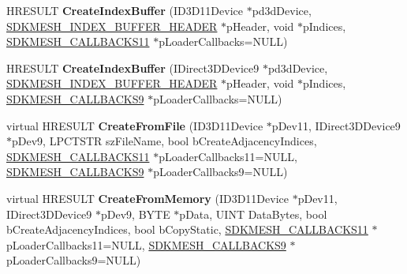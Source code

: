 \begin{DoxyCompactItemize}
\item 
\hypertarget{class_c_d_x_u_t_s_d_k_mesh_abbf305d6839d4ad44b981e291a337a80}{H\+R\+E\+S\+U\+L\+T {\bfseries Create\+Index\+Buffer} (I\+D3\+D11\+Device $\ast$pd3d\+Device, \hyperlink{struct_s_d_k_m_e_s_h___i_n_d_e_x___b_u_f_f_e_r___h_e_a_d_e_r}{S\+D\+K\+M\+E\+S\+H\+\_\+\+I\+N\+D\+E\+X\+\_\+\+B\+U\+F\+F\+E\+R\+\_\+\+H\+E\+A\+D\+E\+R} $\ast$p\+Header, void $\ast$p\+Indices, \hyperlink{struct_s_d_k_m_e_s_h___c_a_l_l_b_a_c_k_s11}{S\+D\+K\+M\+E\+S\+H\+\_\+\+C\+A\+L\+L\+B\+A\+C\+K\+S11} $\ast$p\+Loader\+Callbacks=N\+U\+L\+L)}\label{class_c_d_x_u_t_s_d_k_mesh_abbf305d6839d4ad44b981e291a337a80}

\item 
\hypertarget{class_c_d_x_u_t_s_d_k_mesh_a4cf855d3faa75099a5f4a7bd0b9b6609}{H\+R\+E\+S\+U\+L\+T {\bfseries Create\+Index\+Buffer} (I\+Direct3\+D\+Device9 $\ast$pd3d\+Device, \hyperlink{struct_s_d_k_m_e_s_h___i_n_d_e_x___b_u_f_f_e_r___h_e_a_d_e_r}{S\+D\+K\+M\+E\+S\+H\+\_\+\+I\+N\+D\+E\+X\+\_\+\+B\+U\+F\+F\+E\+R\+\_\+\+H\+E\+A\+D\+E\+R} $\ast$p\+Header, void $\ast$p\+Indices, \hyperlink{struct_s_d_k_m_e_s_h___c_a_l_l_b_a_c_k_s9}{S\+D\+K\+M\+E\+S\+H\+\_\+\+C\+A\+L\+L\+B\+A\+C\+K\+S9} $\ast$p\+Loader\+Callbacks=N\+U\+L\+L)}\label{class_c_d_x_u_t_s_d_k_mesh_a4cf855d3faa75099a5f4a7bd0b9b6609}

\item 
\hypertarget{class_c_d_x_u_t_s_d_k_mesh_a7dfa840bc833d2b9ff22f5b469d9bba6}{virtual H\+R\+E\+S\+U\+L\+T {\bfseries Create\+From\+File} (I\+D3\+D11\+Device $\ast$p\+Dev11, I\+Direct3\+D\+Device9 $\ast$p\+Dev9, L\+P\+C\+T\+S\+T\+R sz\+File\+Name, bool b\+Create\+Adjacency\+Indices, \hyperlink{struct_s_d_k_m_e_s_h___c_a_l_l_b_a_c_k_s11}{S\+D\+K\+M\+E\+S\+H\+\_\+\+C\+A\+L\+L\+B\+A\+C\+K\+S11} $\ast$p\+Loader\+Callbacks11=N\+U\+L\+L, \hyperlink{struct_s_d_k_m_e_s_h___c_a_l_l_b_a_c_k_s9}{S\+D\+K\+M\+E\+S\+H\+\_\+\+C\+A\+L\+L\+B\+A\+C\+K\+S9} $\ast$p\+Loader\+Callbacks9=N\+U\+L\+L)}\label{class_c_d_x_u_t_s_d_k_mesh_a7dfa840bc833d2b9ff22f5b469d9bba6}

\item 
\hypertarget{class_c_d_x_u_t_s_d_k_mesh_a4e87c52d478b54874a18036375291fa9}{virtual H\+R\+E\+S\+U\+L\+T {\bfseries Create\+From\+Memory} (I\+D3\+D11\+Device $\ast$p\+Dev11, I\+Direct3\+D\+Device9 $\ast$p\+Dev9, B\+Y\+T\+E $\ast$p\+Data, U\+I\+N\+T Data\+Bytes, bool b\+Create\+Adjacency\+Indices, bool b\+Copy\+Static, \hyperlink{struct_s_d_k_m_e_s_h___c_a_l_l_b_a_c_k_s11}{S\+D\+K\+M\+E\+S\+H\+\_\+\+C\+A\+L\+L\+B\+A\+C\+K\+S11} $\ast$p\+Loader\+Callbacks11=N\+U\+L\+L, \hyperlink{struct_s_d_k_m_e_s_h___c_a_l_l_b_a_c_k_s9}{S\+D\+K\+M\+E\+S\+H\+\_\+\+C\+A\+L\+L\+B\+A\+C\+K\+S9} $\ast$p\+Loader\+Callbacks9=N\+U\+L\+L)}\label{class_c_d_x_u_t_s_d_k_mesh_a4e87c52d478b54874a18036375291fa9}


\end{DoxyCompactItemize}
